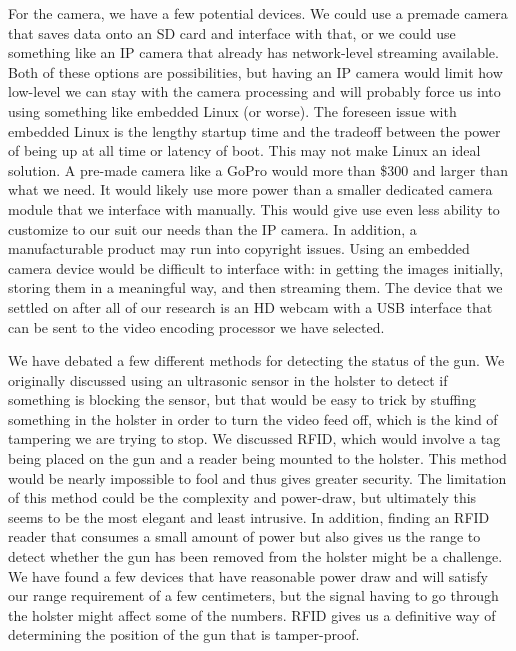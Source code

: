 \documentclass[12pt]{article}
\begin{document}
For the camera, we have a few potential devices. We could use a premade camera
that saves data onto an SD card and interface with that, or we could use
something like an IP camera that already has network-level streaming available.
Both of these options are possibilities, but having an IP camera would limit
how low-level we can stay with the camera processing and will probably force us
into using something like embedded Linux (or worse). The foreseen issue with
embedded Linux is the lengthy startup time and the tradeoff between the power
of being up at all time or latency of boot. This may not make Linux an ideal
solution. A pre-made camera like a GoPro would more than \$300 and larger than
what we need. It would likely use more power than a smaller dedicated camera
module that we interface with manually. This would give use even less ability
to customize to our suit our needs than the IP camera. In addition, a
manufacturable product may run into copyright issues. Using an embedded camera
device would be difficult to interface with: in getting the images initially,
storing them in a meaningful way, and then streaming them. The device that we
settled on after all of our research is an HD webcam with a USB interface that
can be sent to the video encoding processor we have selected.

We have debated a few different methods for detecting the status of the gun. We
originally discussed using an ultrasonic sensor in the holster to detect if
something is blocking the sensor, but that would be easy to trick by stuffing
something in the holster in order to turn the video feed off, which is the kind
of tampering we are trying to stop. We discussed RFID, which would involve a
tag being placed on the gun and a reader being mounted to the holster. This
method would be nearly impossible to fool and thus gives greater security. The
limitation of this method could be the complexity and power-draw, but
ultimately this seems to be the most elegant and least intrusive. In addition,
finding an RFID reader that consumes a small amount of power but also gives us
the range to detect whether the gun has been removed from the holster might be
a challenge. We have found a few devices that have reasonable power draw and
will satisfy our range requirement of a few centimeters, but the signal having
to go through the holster might affect some of the numbers. RFID gives us a
definitive way of determining the position of the gun that is tamper-proof.
\end{document}
